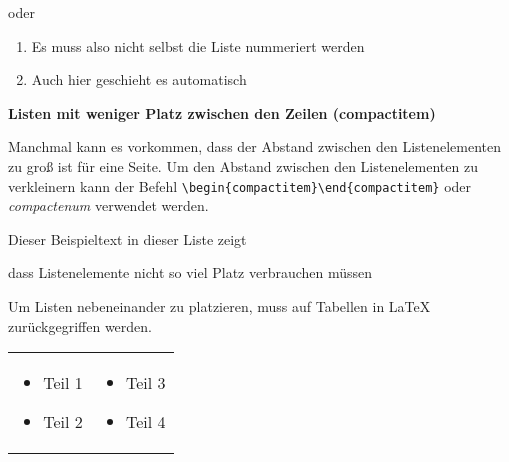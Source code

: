 oder 

\begin{enumerate}[{Beispiel} (a)]
	\item Es muss also nicht selbst die Liste nummeriert werden
	\item Auch hier geschieht es automatisch
\end{enumerate}

\textbf{Listen mit weniger Platz zwischen den Zeilen (compactitem)}

Manchmal kann es vorkommen, dass der Abstand zwischen den Listenelementen zu groß ist für eine Seite. Um den Abstand zwischen den Listenelementen zu verkleinern kann der Befehl \verb|\begin{compactitem}\end{compactitem}| oder \emph{compactenum} verwendet werden.
 
\begin{compactitem}
	\item Dieser Beispieltext in dieser Liste zeigt
	\item dass Listenelemente nicht so viel Platz verbrauchen müssen
\end{compactitem}

\vspace{1cm} %
Um Listen nebeneinander zu platzieren, muss auf Tabellen in \LaTeX{} zurückgegriffen werden. 

\begin{tabular}{ll}
	\parbox{5cm}{
		\begin{itemize}
			\item Teil 1
			\item Teil 2
	\end{itemize}}
	&
	\parbox{5cm}{
		\begin{itemize}
			\item Teil 3
			\item Teil 4
	\end{itemize}}
\end{tabular}